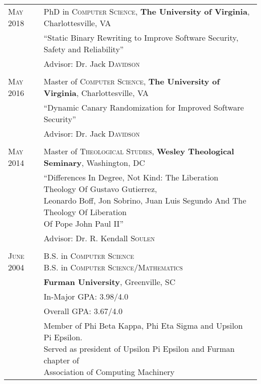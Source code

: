 \documentclass[a4paper,10pt]{article} %
\begin{document}
\begin{tabular}{ll}
\textsc{May} 2018 & PhD in \textsc{Computer Science}, \textbf{The University of Virginia}, Charlottesville, VA\\
& ``Static Binary Rewriting to Improve Software Security, Safety and Reliability'' \\
&\small Advisor: Dr. Jack \textsc{Davidson}\\
&\\

\textsc{May} 2016 & Master of \textsc{Computer Science}, \textbf{The University of Virginia}, Charlottesville, VA\\
& ``Dynamic Canary Randomization for Improved Software Security'' \\
&\small Advisor: Dr. Jack \textsc{Davidson}\\
&\\

\textsc{May} 2014 & Master of \textsc{Theological Studies}, \textbf{Wesley Theological Seminary}, Washington, DC\\
& \makecell[l]{``Differences In Degree, Not Kind: The Liberation Theology Of Gustavo Gutierrez,\\ Leonardo Boff, Jon Sobrino, Juan Luis Segundo And The Theology Of Liberation \\ Of Pope John Paul II''} \\
&\small Advisor: Dr. R. Kendall \textsc{Soulen}\\
&\\

\textsc{June} 2004 & \makecell[lt]{ B.S. in \textsc{Computer Science} \\ B.S. in \textsc{Computer Science/Mathematics}
} \\
&\textbf{Furman University}, Greenville, SC\\
&In-Major GPA: 3.98/4.0\\
&Overall GPA: 3.67/4.0 \\
&\makecell[l]{Member of Phi Beta Kappa, Phi Eta Sigma and Upsilon Pi Epsilon. \\ Served as president of Upsilon Pi Epsilon and Furman chapter of \\ Association of Computing Machinery}\\

\end{tabular}


\end{document}
